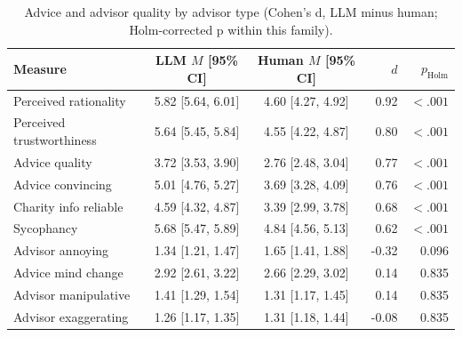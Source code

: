 \begin{table}

\caption{\label{tab:advisor_quality}Advice and advisor quality by advisor type (Cohen's d, LLM minus human; Holm-corrected p within this family).}
\centering
\begin{tabular}[t]{lccrr}
\toprule
Measure & LLM $M$ [95\% CI] & Human $M$ [95\% CI] & $d$ & $p_{\mathrm{Holm}}$\\
\midrule
Perceived rationality & 5.82 [5.64, 6.01] & 4.60 [4.27, 4.92] & 0.92 & $<.001$\\
Perceived trustworthiness & 5.64 [5.45, 5.84] & 4.55 [4.22, 4.87] & 0.80 & $<.001$\\
Advice quality & 3.72 [3.53, 3.90] & 2.76 [2.48, 3.04] & 0.77 & $<.001$\\
Advice convincing & 5.01 [4.76, 5.27] & 3.69 [3.28, 4.09] & 0.76 & $<.001$\\
Charity info reliable & 4.59 [4.32, 4.87] & 3.39 [2.99, 3.78] & 0.68 & $<.001$\\
\addlinespace
Sycophancy & 5.68 [5.47, 5.89] & 4.84 [4.56, 5.13] & 0.62 & $<.001$\\
Advisor annoying & 1.34 [1.21, 1.47] & 1.65 [1.41, 1.88] & -0.32 & 0.096\\
Advice mind change & 2.92 [2.61, 3.22] & 2.66 [2.29, 3.02] & 0.14 & 0.835\\
Advisor manipulative & 1.41 [1.29, 1.54] & 1.31 [1.17, 1.45] & 0.14 & 0.835\\
Advisor exaggerating & 1.26 [1.17, 1.35] & 1.31 [1.18, 1.44] & -0.08 & 0.835\\
\bottomrule
\end{tabular}
\end{table}

